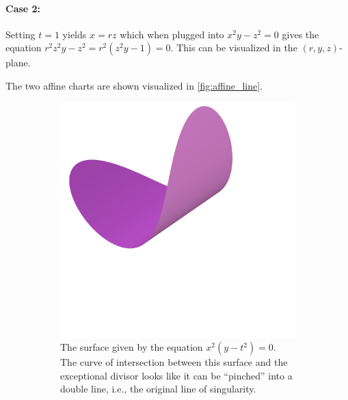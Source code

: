 \documentclass{article}
\begin{document}
\begin{example}
        \paragraph{Case 2:}
        \label{par:case_2_}
        Setting $t = 1$ yields $x = rz$ which when plugged into $x^2y-z^2 = 0$
        gives the equation $r^2z^2y - z^2 = r^2(z^2y - 1) = 0$. This can be
        visualized in the $(r, y, z)$-plane.

        The two affine charts are shown visualized in \cref{fig:affine_line}.

        \begin{figure}[h!]
            \centering
            \begin{subfigure}[t]{0.3\textwidth}
                \includegraphics[width=\textwidth]{pictures/line_blowup_affine_1.png}
                \caption{The surface given by the equation $x^2(y - t^2) = 0$. The
                    curve of intersection between this surface and the exceptional
                    divisor looks like it can be ``pinched'' into a double line, i.e., the
                original line of singularity.}
            \end{subfigure}
            ~
            \begin{subfigure}[t]{0.3\textwidth}

\end{subfigure}
\end{figure}
\end{example}
\end{document}
